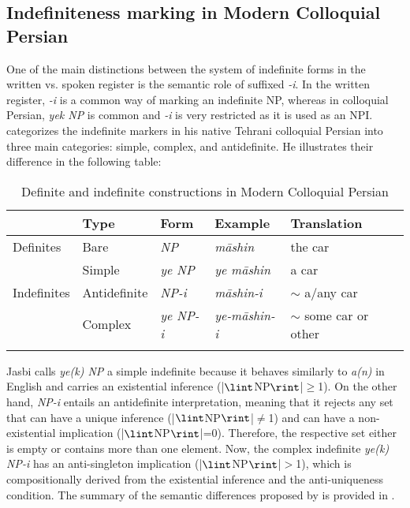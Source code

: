 \documentclass[output=paper]{langsci/langscibook}
\begin{document}
\subsection{Indefiniteness marking in Modern Colloquial Persian}\label{4sec:33}

One of the main distinctions between the system of indefinite forms in the written vs. spoken register is the semantic role of suffixed {\emph{-i}}. In the written register, {\emph{-i}} is a common way of marking an indefinite NP, whereas in colloquial Persian, {\emph{yek NP}} is common and {\emph{-i}} is very restricted as it is used as an NPI. \cite[][246]{jasbi:16} categorizes the indefinite markers in his native Tehrani colloquial Persian into three main categories: simple, complex, and antidefinite. He illustrates their difference in the following table:

\begin{table}

\begin{tabularx}{\textwidth}{Xllll}
\lsptoprule
	& Type		& Form		& Example	& Translation \\
\midrule
Definites & Bare & {\emph{NP}} & {\emph{māshin}} & the car \\[1mm]
\hdashline
			& Simple & {\emph{ye NP}}	 & {\emph{ye māshin}} & a car \\
Indefinites	 	& Antidefinite & {\emph{NP-i}} & {\emph{māshin-i}}	 & $\sim$ a/any car \\
			& Complex & {\emph{ye NP-i}} & {\emph{ye-māshin-i}} & $\sim$ some car or other \\
\lspbottomrule
\end{tabularx}
\caption{Definite and indefinite constructions in Modern Colloquial \mbox{Persian} \citep[][246]{jasbi:16}}\label{4table:3}
\end{table}

Jasbi calls {\emph{ye(k) NP}} a simple indefinite because it behaves similarly to {\emph{a(n)}} in English and carries an existential inference (|$\lint$NP$\rint$|$\geq$1). On the other hand, {\emph{NP-i}} entails an antidefinite interpretation, meaning that it rejects any set that can have a unique inference (|$\lint$NP$\rint$|$\not=$1) and can have a non-existential implication (|$\lint$NP$\rint$|=0). Therefore, the respective set either is empty or contains more than one element. Now, the complex indefinite {\emph{ye(k) NP-i}} has an anti-singleton implication (|$\lint$NP$\rint$|$>$1), which is compositionally derived from the existential inference and the anti-uniqueness condition. The summary of the semantic differences proposed by \cite[][251]{jasbi:16} is provided in .
\end{document}
